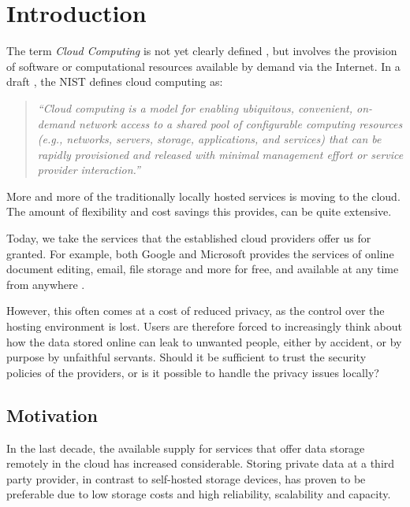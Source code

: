 \documentclass[pdftex,english,10pt,b5paper,twoside]{book}
\begin{document}
\chapter{Introduction}
\label{ch:intro}
\setcounter{page}{1}

The term \emph{Cloud Computing} is not yet clearly defined \cite{clouddef}, but
involves the provision of software or computational resources available by
demand via the Internet.  In a draft \cite{cloud_nistdef}, the \ac{NIST}
defines cloud computing as: 

\begin{quote}\it ``Cloud computing is a model for enabling ubiquitous,
convenient, on-demand network access to a shared pool of configurable computing
resources (e.g., networks, servers, storage, applications, and services) that
can be rapidly provisioned and released with minimal management effort or
service provider interaction.'' \end{quote}

More and more of the traditionally locally hosted services is moving to the
cloud. The amount of flexibility and cost savings this provides, can be quite
extensive.

Today, we take the services that the established cloud providers offer us for
granted. For example, both Google and Microsoft provides the services of online
document editing, email, file storage and more for free, and available at any
time from anywhere \cite{googleservices, microsoftservices}.

However, this often comes at a cost of reduced privacy, as the control over the
hosting environment is lost. Users are therefore forced to increasingly think
about how the data stored online can leak to unwanted people, either by
accident, or by purpose by unfaithful servants. Should it be sufficient to
trust the security policies of the providers, or is it possible to handle the
privacy issues locally?

\section{Motivation}

In the last decade, the available supply for services that offer data storage
remotely in the cloud has increased considerable. Storing private data at a
third party provider, in contrast to self-hosted storage devices, has proven to
be preferable due to low storage costs and high reliability, scalability and
capacity.
\end{document}
